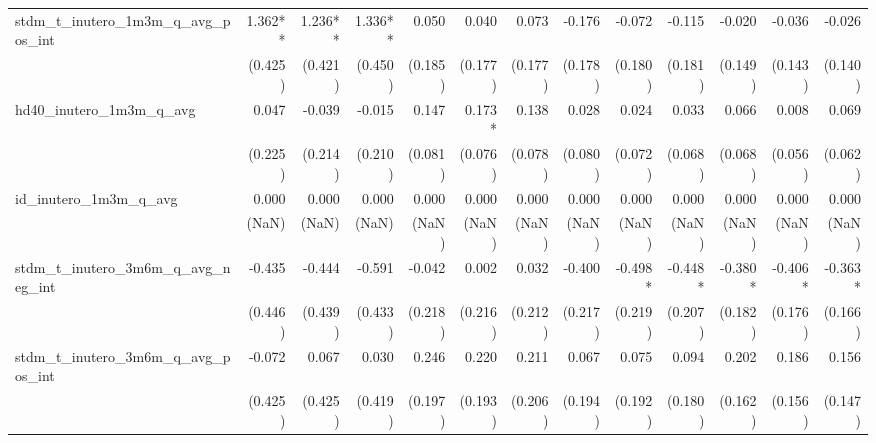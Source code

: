 \begin{tabular}{lrrrrrrrrrrrr}
stdm\_t\_inutero\_1m3m\_q\_avg\_pos\_int    &      1.362** &      1.236** &      1.336** &        0.050 &        0.040 &        0.073 &       -0.176 &       -0.072 &       -0.115 &       -0.020 &       -0.036 &       -0.026 \\ 
                                            &      (0.425) &      (0.421) &      (0.450) &      (0.185) &      (0.177) &      (0.177) &      (0.178) &      (0.180) &      (0.181) &      (0.149) &      (0.143) &      (0.140) \\ 
hd40\_inutero\_1m3m\_q\_avg                 &        0.047 &       -0.039 &       -0.015 &        0.147 &       0.173* &        0.138 &        0.028 &        0.024 &        0.033 &        0.066 &        0.008 &        0.069 \\ 
                                            &      (0.225) &      (0.214) &      (0.210) &      (0.081) &      (0.076) &      (0.078) &      (0.080) &      (0.072) &      (0.068) &      (0.068) &      (0.056) &      (0.062) \\ 
id\_inutero\_1m3m\_q\_avg                   &        0.000 &        0.000 &        0.000 &        0.000 &        0.000 &        0.000 &        0.000 &        0.000 &        0.000 &        0.000 &        0.000 &        0.000 \\ 
                                            &        (NaN) &        (NaN) &        (NaN) &        (NaN) &        (NaN) &        (NaN) &        (NaN) &        (NaN) &        (NaN) &        (NaN) &        (NaN) &        (NaN) \\ 
stdm\_t\_inutero\_3m6m\_q\_avg\_neg\_int    &       -0.435 &       -0.444 &       -0.591 &       -0.042 &        0.002 &        0.032 &       -0.400 &      -0.498* &      -0.448* &      -0.380* &      -0.406* &      -0.363* \\ 
                                            &      (0.446) &      (0.439) &      (0.433) &      (0.218) &      (0.216) &      (0.212) &      (0.217) &      (0.219) &      (0.207) &      (0.182) &      (0.176) &      (0.166) \\ 
stdm\_t\_inutero\_3m6m\_q\_avg\_pos\_int    &       -0.072 &        0.067 &        0.030 &        0.246 &        0.220 &        0.211 &        0.067 &        0.075 &        0.094 &        0.202 &        0.186 &        0.156 \\ 
                                            &      (0.425) &      (0.425) &      (0.419) &      (0.197) &      (0.193) &      (0.206) &      (0.194) &      (0.192) &      (0.180) &      (0.162) &      (0.156) &      (0.147) \\ 

\end{tabular}
